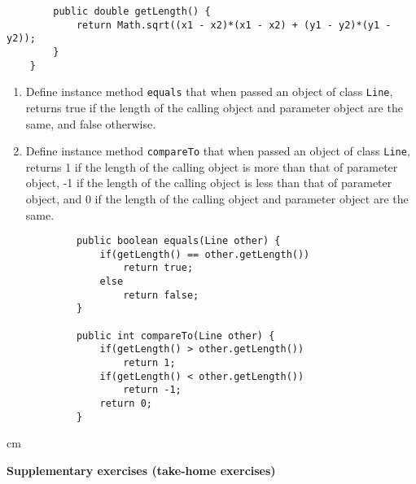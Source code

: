 \begin{questions}
\begin{enumerate}
\begin{lstlisting}
		public double getLength() {
			return Math.sqrt((x1 - x2)*(x1 - x2) + (y1 - y2)*(y1 - y2));
		}
	}
\end{lstlisting}
	
		\begin{enumerate}
		
			\item Define instance method \texttt{equals} that when passed an object of class \texttt{Line}, returns true if the length of the calling object and parameter object are the same, and false otherwise.
			
			\item Define instance method \texttt{compareTo} that when passed an object of class \texttt{Line}, returns 1 if the length of the calling object is more than that of parameter object, -1 if the length of the calling object is less than that of parameter object, and 0 if the length of the calling object and parameter object are the same.
		\end{enumerate}	
		
		\begin{solution}
		\begin{lstlisting}
			public boolean equals(Line other) {
				if(getLength() == other.getLength())
					return true;
				else
					return false;
			}
			
			public int compareTo(Line other) {
				if(getLength() > other.getLength())
					return 1;
				if(getLength() < other.getLength())
					return -1;
				return 0;
			}
		\end{lstlisting}	
		\end{solution}

	\end{enumerate}
\end{questions}

\noindent\makebox[\linewidth]{\rule{\paperwidth}{0.4pt}}
 cm 

\begin{center}
\large
\textbf{Supplementary exercises (take-home exercises)}
\end{center}
\normalsize


